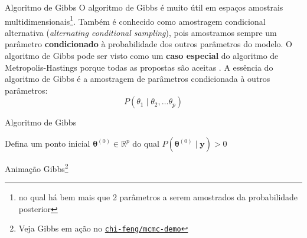 \begin{frame}{Algoritmo de Gibbs}
  O algoritmo de Gibbs é muito útil em espaços amostrais multidimensionais\footnote{
  no qual há bem mais que 2 parâmetros a serem amostrados da probabilidade posterior}.
  Também é conhecido como amostragem condicional alternativa
  (\textit{alternating conditional sampling}), pois amostramos sempre um parâmetro
  \textbf{condicionado} à probabilidade dos outros parâmetros do modelo.
  \vfill
  O algoritmo de Gibbs pode ser visto como um \textbf{caso especial} do algoritmo
  de Metropolis-Hastings porque todas as propostas são aceitas
  \parencite{gelmanIterativeNonIterativeSimulation1992}.
  \vfill
  A essência do algoritmo de Gibbs é a amostragem de parâmetros condicionada à outros parâmetros:
  $$P(\theta_1 \mid \theta_2, \dots \theta_p)$$
\end{frame}

\begin{frame}[fragile]{Algoritmo de Gibbs}
    \SetAlCapFnt{\normalsize}
    \SetAlCapNameFnt{\normalsize}
    \begin{algorithm}[H]
    \DontPrintSemicolon
    \SetAlgoNoEnd
    \SetAlgoLined
    Defina um ponto inicial $\boldsymbol{\theta}^{(0)} \in \mathbb{R}^p$ do qual $P\left(\boldsymbol{\theta}^{(0)} \mid \boldsymbol{y} \right) > 0$\;
     \caption{Gibbs}
    \end{algorithm}
\end{frame}

\begin{frame}{Animação Gibbs\footnote{Veja Gibbs em ação no \href{https://chi-feng.github.io/mcmc-demo/app.html?algorithm=GibbsSampling&target=banana}{\texttt{chi-feng/mcmc-demo}}}}
  \centering
\end{frame}

